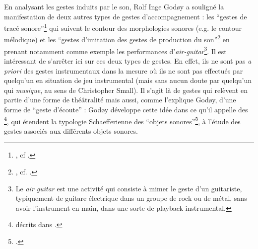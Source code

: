 \indent En analysant les gestes induits par le son, Rolf Inge Godøy a souligné la manifestation de deux autres types de gestes d'accompagnement : les ``gestes de tracé sonore''\footnote{, cf \cite{godoy_exploring_2006}.} qui suivent le contour des morphologies sonores (e.g. le contour mélodique) et les ``gestes d'imitation des gestes de production du son''\footnote{, cf. \cite{godoy_playing_2005}.} en prenant notamment comme exemple les performances d'\textit{air-guitar}\footnote{Le \textit{air guitar} est une activité qui consiste à mimer le geste d’un guitariste, typiquement de guitare électrique dans un groupe de rock ou de métal, sans avoir l’instrument en main, dans une sorte de playback instrumental.}. Il est intéressant de s'arrêter ici sur ces deux types de gestes. En effet, ils ne sont pas \textit{a priori} des gestes instrumentaux dans la mesure où ils ne sont pas effectués par quelqu'un en situation de jeu instrumental (mais sans aucun doute par quelqu'un qui \textit{musique}, au sens de Christopher Small). Il s'agit là de gestes qui relèvent en partie d'une forme de théâtralité mais aussi, comme l'explique Godøy, d'une forme de ``geste d'écoute'' :  Godøy développe cette idée dans ce qu'il appelle des \footnote{ décrits dans \cite{godoy_gestural-sonorous_2006}.}, qui étendent la typologie Schaefferienne des ``objets sonores''\footnote{\cite{schaeffer_traite_1966}.}, à l'étude des gestes associés aux différents objets sonores.\\
